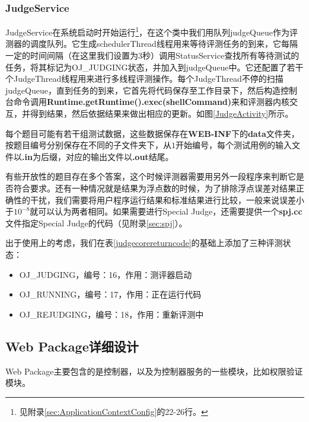 \subsubsection{JudgeService}
JudgeService在系统启动时开始运行\footnote{见附录\ref{sec:ApplicationContextConfig}的22-26行。}，在这个类中我们用队列judgeQueue作为评测器的调度队列。它生成schedulerThread线程用来等待评测任务的到来，它每隔一定的时间间隔（在这里我们设置为3秒）调用StatusService查找所有等待测试的任务，将其标记为OJ\_JUDGING状态，并加入到judgeQueue中。它还配置了若干个JudgeThread线程用来进行多线程评测操作。每个JudgeThread不停的扫描judgeQueue，直到任务的到来，它首先将代码保存至工作目录下，然后构造控制台命令调用\textbf{Runtime.getRuntime().exec(shellCommand)}来和评测器内核交互，并得到结果，然后依据结果来做出相应的更新。如图\ref{JudgeActivity}所示。


每个题目可能有若干组测试数据，这些数据保存在\textbf{WEB-INF}下的\textbf{data}文件夹，按题目编号分别保存在不同的子文件夹下，从$1$开始编号，每个测试用例的输入文件以\textbf{.in}为后缀，对应的输出文件以\textbf{.out}结尾。

有些开放性的题目存在多个答案，这个时候评测器需要用另外一段程序来判断它是否符合要求。还有一种情况就是结果为浮点数的时候，为了排除浮点误差对结果正确性的干扰，我们需要将用户程序运行结果和标准结果进行比较，一般来说误差小于$10^{-8}$就可以认为两者相同。如果需要进行Special Judge，还需要提供一个\textbf{spj.cc}文件指定Special Judge的代码（见附录\ref{sec:spj}）。

出于使用上的考虑，我们在表\ref{judgecorereturncode}的基础上添加了三种评测状态：
\begin{itemize}
	\item OJ\_JUDGING，编号：16，作用：测评器启动
	\item OJ\_RUNNING，编号：17，作用：正在运行代码
	\item OJ\_REJUDGING，编号：18，作用：重新评测中
\end{itemize}

\subsection{Web Package详细设计}
Web Package主要包含的是控制器，以及为控制器服务的一些模块，比如权限验证模块。

